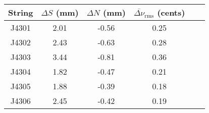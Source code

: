 \begin{tabular}{cccccc}
\toprule
String & $\Delta S$ (mm) & $\Delta N$ (mm) & $\overline{\Delta \nu}_\text{rms}$ (cents) \\
\midrule
J4301 & 2.01 & -0.56 & 0.25 \\
J4302 & 2.43 & -0.63 & 0.28 \\
J4303 & 3.44 & -0.81 & 0.36 \\
J4304 & 1.82 & -0.47 & 0.21 \\
J4305 & 1.88 & -0.39 & 0.18 \\
J4306 & 2.45 & -0.42 & 0.19 \\
\bottomrule
\end{tabular}

